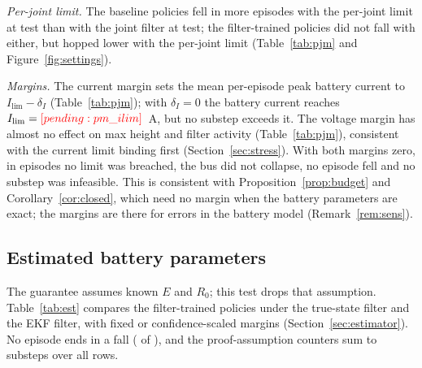 \emph{Per-joint limit.} The baseline policies fell in more episodes with the per-joint limit at test than with the joint filter at test; the filter-trained policies did not fall with either, but hopped lower with the per-joint limit (Table~\ref{tab:pjm} and Figure~\ref{fig:settings}).

\emph{Margins.} The current margin sets the mean per-episode peak battery current to $I_{\lim}-\delta_I$ (Table~\ref{tab:pjm}); with $\delta_I=0$ the battery current reaches $I_{\lim}=\res{pm_ilim}$~A, but no substep exceeds it. The voltage margin has almost no effect on max height and filter activity (Table~\ref{tab:pjm}), consistent with the current limit binding first (Section~\ref{sec:stress}). With both margins zero, in  episodes no limit was breached, the bus did not collapse, no episode fell and no substep was infeasible. This is consistent with Proposition~\ref{prop:budget} and Corollary~\ref{cor:closed}, which need no margin when the battery parameters are exact; the margins are there for errors in the battery model (Remark~\ref{rem:sens}).
\begin{table}[tbp]\centering\caption{Joint-level limit and margins, warm-started policies,  seeds $\times$  episodes per state of charge (the episodes of the stress tests). Per-joint limit: the filter's budget split equally between the two drives, each joint limited on its own, at test time only. Margins: the policies trained with the filter, evaluated with the joint filter and the margins given. Violation and collapse times: largest over the three states of charge of the mean over seeds; peak $\Ib$: largest over the states of charge of the mean per-episode peak; infeasible time likewise. Falls: count over seeds and states of charge. Hops and filter or limiter active: mean over states of charge.}\label{tab:pjm}
\end{table}

\subsection{Estimated battery parameters}\label{sec:estresults}
The guarantee assumes known $E$ and $R_0$; this test drops that assumption. Table~\ref{tab:est} compares the filter-trained policies under the true-state filter and the EKF filter, with fixed or confidence-scaled margins (Section~\ref{sec:estimator}). No episode ends in a fall ( of ), and the proof-assumption counters sum to  substeps over all rows.

